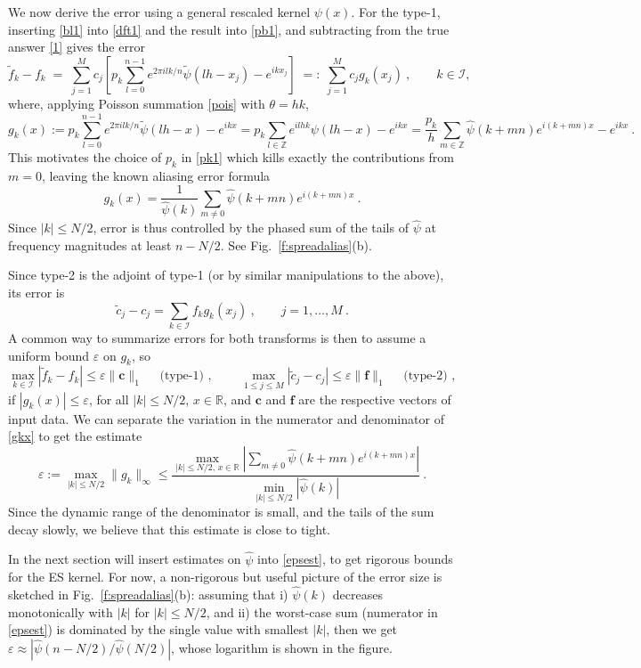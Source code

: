 \documentclass[10pt]{article}
\newcommand{\be}{\begin{equation}}
\newcommand{\ee}{\end{equation}}
\newcommand{\mbf}[1]{{\mathbf #1}}
\newcommand{\RR}{\mathbb{R}}
\newcommand{\ZZ}{\mathbb{Z}}
\newcommand{\eps}{\varepsilon}
\newcommand{\KK}{{\mathcal I}}     %
\newcommand{\ppsi}{{\tilde\psi}}   %
\begin{document}
We now derive the error using a general rescaled kernel $\psi(x)$.
For the type-1, inserting \eqref{bl1} into \eqref{dft1}
and the result into \eqref{pb1}, and subtracting from the true answer
\eqref{1} gives the error
$$
\tilde f_k - f_k  \;=\;
\sum_{j=1}^M c_j \left[ p_k \sum_{l=0}^{n-1} e^{2\pi i l k/n}
  \ppsi(lh-x_j) - e^{ikx_j} \right ]
\;=:\; \sum_{j=1}^M c_j g_k(x_j)
~, \qquad k\in\KK,
$$
where, applying Poisson summation \eqref{pois} with $\theta=hk$,
$$
g_k(x) :=  p_k \sum_{l=0}^{n-1} e^{2\pi i l k/n}
\ppsi(lh-x) - e^{ikx}
= p_k \sum_{l\in\ZZ} e^{ilhk} \psi(lh-x) - e^{ikx}
=
\frac{p_k}{h} \sum_{m\in\ZZ} \hat\psi(k+mn) e^{i(k+mn)x} - e^{ikx}
~.
$$
This motivates the choice of $p_k$ in \eqref{pk1} which
kills exactly the contributions from
$m=0$, leaving the known aliasing error formula \cite[(1.16)]{nfftchap}
\cite[(4.1)]{fourmont} \cite[Sec.~V.B]{fessler}
\be
g_k(x) = \frac{1}{\hat\psi(k)}\sum_{m\neq 0} \hat\psi(k+mn) e^{i(k+mn)x}
~.
\label{gkx}
\ee
Since $|k|\le N/2$,
error is thus controlled by the phased sum of the tails of $\hat\psi$
at frequency magnitudes at least $n-N/2$. See Fig.~\ref{f:spreadalias}(b).

Since type-2 is the adjoint of type-1 (or by similar manipulations to the
above), its error is
\be
\tilde c_j - c_j = \sum_{k\in\KK} f_k g_k(x_j)
~, \qquad j=1,\dots,M~.
\ee
A common way to summarize errors for both transforms is then
to assume a uniform bound $\eps$ on $g_k$, so
\be
\max_{k\in\KK}|\tilde f_k - f_k| \le \eps \|\mbf{c}\|_1
\quad \mbox{ (type-1)~, } \qquad
\max_{1\le j\le M}|\tilde c_j - c_j| \le \eps \|\mbf{f}\|_1
\quad \mbox{ (type-2)~, }
\label{1nrm}
\ee
if $|g_k(x)| \le \eps$, for all $|k|\le N/2$, $x\in\RR$,
and $\mbf{c}$ and $\mbf{f}$ are the respective vectors of input data.
We can separate the variation in the numerator and denominator
of \eqref{gkx} to get the estimate
\be
\eps := \max_{|k|\le N/2}
\|g_k\|_\infty \le
\frac{
  \max_{|k|\le N/2, \,x\in\RR} \left|
    \sum_{m\neq 0} \hat\psi(k+mn) e^{i(k+mn)x}
  \right|
}{\min_{|k|\le N/2} |\hat\psi(k)|}
~.
\label{epsest}
\ee
Since the dynamic range of the denominator is small, and the tails
of the sum decay slowly, we believe that this estimate is close to tight.

In the next section will insert estimates on $\hat\psi$ into
\eqref{epsest}, to get rigorous bounds for the ES kernel.
For now, a non-rigorous but useful picture of the error size
is sketched in Fig.~\ref{f:spreadalias}(b):
assuming that i) $\hat\psi(k)$ decreases monotonically
with $|k|$ for $|k|\le N/2$, and  ii) the worst-case sum (numerator in \eqref{epsest}) is dominated by the single value with smallest $|k|$,
then we get $ \eps \approx |\hat\psi(n-N/2) / \hat\psi(N/2) |$,
whose logarithm is shown in the figure.
\end{document}

